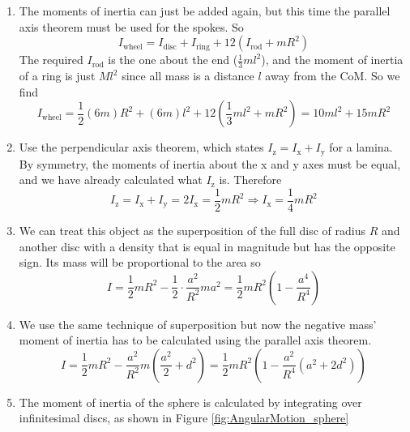 \begin{hint}
{\begin{enumerate}
\begin{align*}
I=\int^R_0 2\pi\rho r^3dr=2\pi\rho[r^4/4]^R_0=\frac{1}{2}\pi\rho R^4 
\end{align*}
and the total mass of the disc is $\pi\rho R^2$ so 
\begin{align*}
=\rho\pi R^2\cdot\frac{1}{2}R^2=\frac{1}{2}mR^2
\end{align*}
\item The moments of inertia can just be added again, but this time the parallel axis theorem must be used for the spokes. So
\begin{equation*}
I_{\textrm{wheel}}=I_{\textrm{disc}}+I_{\textrm{ring}}+12\left(I_{\textrm{rod}}+mR^2\right)
\end{equation*}
The required $I_{\textrm{rod}}$ is the one about the end ($\frac{1}{3}ml^2$), and the moment of inertia of a ring is just $Ml^2$ since all mass is a distance $l$ away from the CoM. So we find
\begin{equation*}
I_{\textrm{wheel}}=\frac{1}{2}(6m)R^2+(6m)l^2+12\left(\frac{1}{3}ml^2+mR^2\right)=10ml^2+15mR^2
\end{equation*}
\item Use the perpendicular axis theorem, which states $I_\textrm{z}=I_\textrm{x}+I_\textrm{y}$ for a lamina. By symmetry, the moments of inertia about the x and y axes must be equal, and we have already calculated what $I_\textrm{z}$ is. Therefore
\begin{equation*}
I_\textrm{z}=I_\textrm{x}+I_\textrm{y}=2I_\textrm{x}=\frac{1}{2}mR^2 \Rightarrow I_\textrm{x}=\frac{1}{4}mR^2
\end{equation*}
\item We can treat this object as the superposition of the full disc of radius $R$ and another disc with a density that is equal in magnitude but has the opposite sign. Its mass will be proportional to the area so
\begin{equation*}
I=\frac{1}{2}mR^2-\frac{1}{2}\cdot\frac{a^2}{R^2}ma^2=\frac{1}{2}mR^2\left(1-\frac{a^4}{R^4}\right)
\end{equation*}
\item We use the same technique of superposition but now the negative mass' moment of inertia has to be calculated using the parallel axis theorem. 
\begin{equation*}
I=\frac{1}{2}mR^2-\frac{a^2}{R^2}m\left(\frac{a^2}{2}+d^2\right)=\frac{1}{2}mR^2\left(1-\frac{a^2}{R^4}\left(a^2+2d^2\right)\right)
\end{equation*}
\item The moment of inertia of the sphere is calculated by integrating over infinitesimal discs, as shown in Figure \ref{fig:AngularMotion_sphere} 

\end{enumerate}}
\end{hint}

